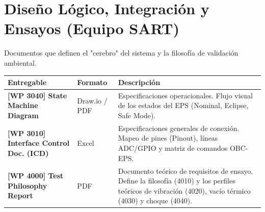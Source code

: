 \section{Diseño Lógico, Integración y Ensayos (Equipo SART)}
\noindent Documentos que definen el "cerebro" del sistema y la filosofía de validación ambiental.

\begin{table}[H]
\centering
\renewcommand{\arraystretch}{1.5}
\begin{tabularx}{\textwidth}{>{\hsize=0.8\hsize}X >{\hsize=0.3\hsize}X >{\hsize=1.9\hsize}X}
\toprule
\textbf{Entregable} & \textbf{Formato} & \textbf{Descripción} \\ \midrule
\textbf{[WP 3040] State Machine Diagram} & Draw.io / PDF & Especificaciones operacionales. Flujo visual de los estados del EPS (Nominal, Eclipse, Safe Mode). \\ 
\textbf{[WP 3010] Interface Control Doc. (ICD)} & Excel & Especificaciones generales de conexión. Mapeo de pines (Pinout), líneas ADC/GPIO y matriz de comandos OBC-EPS. \\ 
\textbf{[WP 4000] Test Philosophy Report} & PDF & Documento teórico de requisitos de ensayo. Define la filosofía (4010) y los perfiles teóricos de vibración (4020), vacío térmico (4030) y choque (4040). \\ \bottomrule
\end{tabularx}
\end{table}